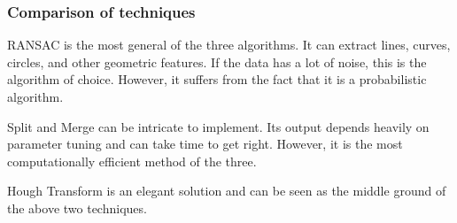 \documentclass[twoside]{article}
\begin{document}
\subsubsection{Comparison of techniques}
RANSAC is the most general of the three algorithms. It can extract lines, curves, circles, and other geometric features. If the data has a lot of noise, this is the algorithm of choice. However, it suffers from the fact that it is a probabilistic algorithm.

Split and Merge can be intricate to implement. Its output depends heavily on parameter tuning and can take time to get right. However, it is the most computationally efficient method of the three.

Hough Transform is an elegant solution and can be seen as the middle ground of the above two techniques.
\end{document}
